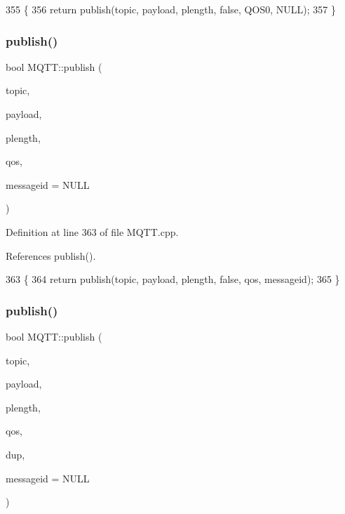 \begin{DoxyCode}
355                                                                                   \{
356     \textcolor{keywordflow}{return} publish(topic, payload, plength, \textcolor{keyword}{false}, QOS0, NULL);
357 \}
\end{DoxyCode}
\mbox{\label{class_m_q_t_t_ae9ea303a55434b8a6bba3147938aa9a9}} 
\subsubsection{publish()\hspace{0.1cm}{\footnotesize\ttfamily [6/10]}}
{\footnotesize\ttfamily bool M\+Q\+T\+T\+::publish (\begin{DoxyParamCaption}\item[{const char $\ast$}]{topic,  }\item[{const uint8\+\_\+t $\ast$}]{payload,  }\item[{unsigned int}]{plength,  }\item[{\textbf{ E\+M\+Q\+T\+T\+\_\+\+Q\+OS}}]{qos,  }\item[{uint16\+\_\+t $\ast$}]{messageid = {\ttfamily NULL} }\end{DoxyParamCaption})}



Definition at line 363 of file M\+Q\+T\+T.\+cpp.



References publish().


\begin{DoxyCode}
363                                                                                                            
                 \{
364     \textcolor{keywordflow}{return} publish(topic, payload, plength, \textcolor{keyword}{false}, qos, messageid);
365 \}
\end{DoxyCode}
\mbox{\label{class_m_q_t_t_a5e7738081e77b6c381f71737e8841869}} 
\subsubsection{publish()\hspace{0.1cm}{\footnotesize\ttfamily [7/10]}}
{\footnotesize\ttfamily bool M\+Q\+T\+T\+::publish (\begin{DoxyParamCaption}\item[{const char $\ast$}]{topic,  }\item[{const uint8\+\_\+t $\ast$}]{payload,  }\item[{unsigned int}]{plength,  }\item[{\textbf{ E\+M\+Q\+T\+T\+\_\+\+Q\+OS}}]{qos,  }\item[{bool}]{dup,  }\item[{uint16\+\_\+t $\ast$}]{messageid = {\ttfamily NULL} }\end{DoxyParamCaption})}



